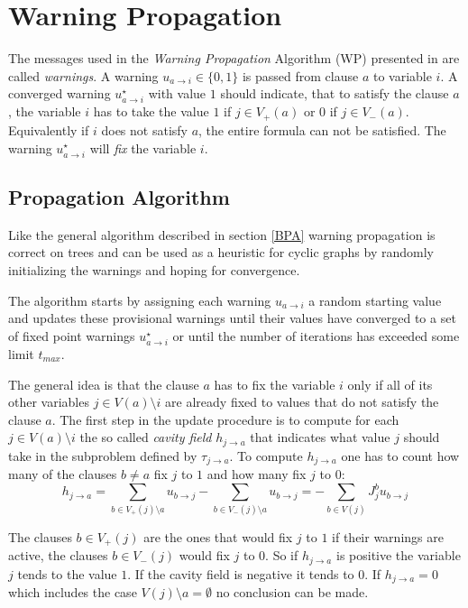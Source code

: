 \section{Warning Propagation}

The messages used in the \emph{Warning Propagation} Algorithm (WP) presented in \cite{survprob} are called \emph{warnings}. A warning $u_{a\rightarrow i} \in \{0, 1\}$ is passed from clause $a$ to variable $i$. A converged warning  $u^{\star}_{a\rightarrow i}$ with value $1$ should indicate, that  to satisfy the clause $a$, the variable $i$ has to take the value $1$ if $j \in V_+(a)$ or $0$ if $j \in V_-(a)$. Equivalently if $i$ does not satisfy $a$, the entire formula can not be satisfied. The warning $u^{\star}_{a \rightarrow i}$ will \emph{fix} the variable $i$. 
\subsection{Propagation Algorithm}

Like the general algorithm described in section \ref{BPA} warning propagation is correct on trees and can be used as a heuristic for cyclic graphs by randomly initializing the warnings and hoping for convergence.

The algorithm starts by assigning each warning $u_{a\rightarrow i}$ a random starting value and updates these provisional warnings until their values have converged to a set of fixed point warnings $u^{\star}_{a \rightarrow i}$ or until the number of iterations has exceeded some limit $t_{max}$.

The general idea is that the clause $a$ has to fix the variable $i$ only if all of its other variables $j \in V(a)\setminus i$ are already fixed to values that do not satisfy the clause $a$. \newline
The first step in the update procedure is to compute for each $j \in V(a) \setminus i$ the so called \emph{cavity field} $h_{j \rightarrow a}$ that indicates what value $j$ should take in the subproblem defined by $\tau_{j \rightarrow a}$. To compute $h_{j \rightarrow a}$ one has to count how many of the clauses $b \neq a$ fix $j$ to $1$ and how many fix $j$ to $0$:
$$h_{j \rightarrow a} = \sum_{b \in V_+(j)\setminus a}{u_{b \rightarrow j}} - \sum_{b \in V_-(j)\setminus a}{u_{b \rightarrow j}} = -\sum_{b \in V(j)} J^b_j u_{b \rightarrow j}$$

The clauses $b \in V_+(j)$ are the ones that would fix $j$ to $1$ if their warnings are active, the clauses $b \in V_-(j)$ would fix $j$ to $0$.
So if $h_{j \rightarrow a}$ is positive the variable $j$ tends to the value $1$. If the cavity field is negative it tends to $0$. If $h_{j \rightarrow a} = 0$ which includes the case $V(j) \setminus a = \emptyset$ no conclusion can be made.

